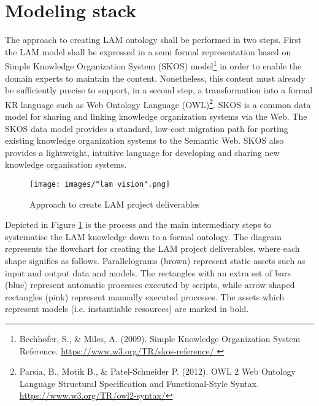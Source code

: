 
\section{Modeling stack}\label{ariaid-title134}

The approach to creating LAM ontology shall be performed in two steps. First the LAM model shall be expressed in a semi formal representation based on Simple Knowledge Organization System (SKOS) model\footnote{Bechhofer, S., \& 	Miles, A. (2009). Simple Knowledge Organization System Reference.  \url{https://www.w3.org/TR/skos-reference/ }} in order to enable the domain experts to maintain the content. Nonetheless, this content must already be sufficiently precise to support, in a second step, a transformation into a formal KR language such as Web Ontology Language (OWL)\footnote{Parsia, B., Motik B.,  \& Patel-Schneider P. (2012). OWL 2 Web Ontology Language Structural Specification and Functional-Style Syntax. \url{https://www.w3.org/TR/owl2-syntax/}}. SKOS is a common data model for sharing and linking knowledge organization systems via the Web. The SKOS data model provides a standard, low-cost migration path for porting existing knowledge organization systems to the Semantic Web. SKOS also provides a lightweight, intuitive language for developing and sharing new knowledge organisation systems.

\begin{figure}[!ht]
	\centering
	\texttt{[image: images/"lam vision".png]}
	\caption{Approach to create LAM project deliverables}
	\label{fig:process-fig}
\end{figure}


Depicted in Figure \ref{fig:process-fig} is the process and the main intermediary steps to systematise the LAM knowledge down to a formal ontology. The diagram represents the flowchart for creating the LAM project deliverables, where each shape signifies as follows. Parallelograms (brown) represent static assets such as input and output data and models. The rectangles with an extra set of bars (blue) represent automatic processes executed by scripts, while arrow shaped rectangles (pink) represent manually executed processes. The assets which represent models (i.e. instantiable resources) are marked in bold. 



